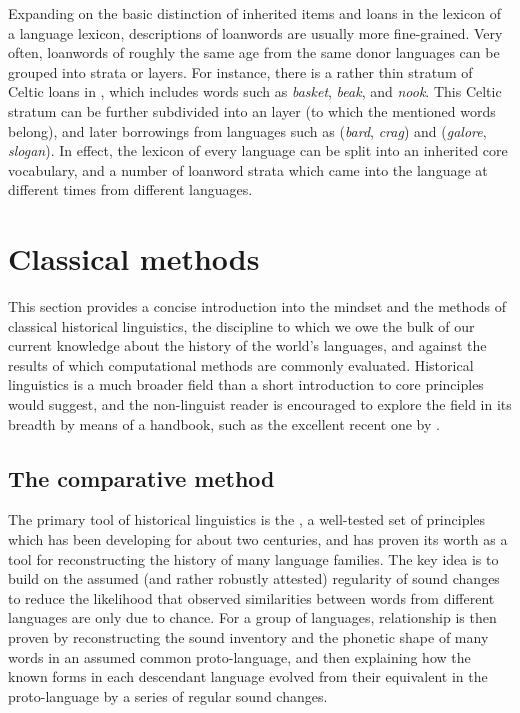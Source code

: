 Expanding on the basic distinction of inherited items and loans in the lexicon of a language lexicon, descriptions of loanwords are usually more fine-grained. Very often, loanwords of roughly the same age from the same donor languages can be grouped into strata or layers. For instance, there is a rather thin stratum of Celtic loans in , which includes words such as \textit{basket}, \textit{beak}, and \textit{nook}. This Celtic stratum can be further subdivided into an  layer (to which the mentioned words belong), and later borrowings from languages such as  (\textit{bard}, \textit{crag}) and  (\textit{galore}, \textit{slogan}). In effect, the lexicon of every language can be split into an inherited core vocabulary, and a number of loanword strata which came into the language at different times from different languages.

\section{Classical methods}\label{sec:2:4}
This section provides a concise introduction into the mindset and the methods of classical historical linguistics, the discipline to which we owe the bulk of our current knowledge about the history of the world's languages, and against the results of which computational methods are commonly evaluated. Historical linguistics is a much broader field than a short introduction to core principles would suggest, and the non-linguist reader is encouraged to explore the field in its breadth by means of a handbook, such as the excellent recent one by \citet{bowern_evans_2015}.

\subsection{The comparative method}
The primary tool of historical linguistics is the \textit{}, a well-tested set of principles which has been developing for about two centuries, and has proven its worth as a tool for reconstructing the history of many language families. The key idea is to build on the assumed (and rather robustly attested) regularity of sound changes to reduce the likelihood that observed similarities between words from different languages are only due to chance. For a group of languages, relationship is then proven by reconstructing the sound inventory and the phonetic shape of many words in an assumed common proto-language, and then explaining how the known forms in each descendant language evolved from their equivalent in the proto-language by a series of regular sound changes.



